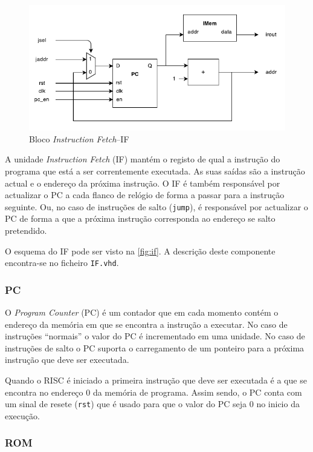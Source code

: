 \documentclass[a4paper]{article}
\begin{document}
			\begin{figure}[H]
				\centering	
				\includegraphics[width=1.\textwidth]{img/IF}
				\caption{Bloco \textit{Instruction Fetch}--IF}
				\label{fig:if}
			\end{figure}

			A unidade \textit{Instruction Fetch} (IF) mantém o registo de qual a instrução do programa que está a ser correntemente executada. As suas saídas são a instrução actual e o endereço da próxima instrução. O IF é também responsável por actualizar o PC a cada flanco de relógio de forma a passar para a instrução seguinte. Ou, no caso de instruções de salto (\texttt{jump}), é responsável por actualizar o PC de forma a que a próxima instrução corresponda ao endereço se salto pretendido.
			
			O esquema do IF pode ser visto na \autoref{fig:if}. A descrição deste componente encontra-se no ficheiro \texttt{IF.vhd}.

			\subsubsection{PC}

			O \textit{Program Counter} (PC) é um contador que em cada momento contém o endereço da memória em que se encontra a instrução a executar. No caso de instruções ``normais'' o valor do PC é incrementado em uma unidade. No caso de instruções de salto o PC suporta o carregamento de um ponteiro para a próxima instrução que deve ser executada.
			
			Quando o \textmu RISC é iniciado a primeira instrução que deve ser executada é a que se encontra no endereço 0 da memória de programa. Assim sendo, o PC conta com um sinal de resete (\texttt{rst}) que é usado para que o valor do PC seja 0 no inicio da execução.

			\subsubsection{ROM}
\end{document}
